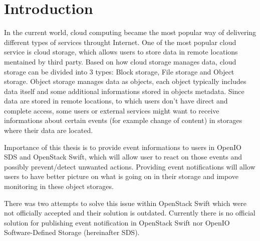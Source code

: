 

\chapter{Introduction}

In the current world, cloud computing became the most popular way of delivering different types of services throught Internet. One of the most popular cloud service is cloud storage, which allows users to store data in remote locations mentained by third party. Based on how cloud storage manages data, cloud storage can be divided into 3 types: Block storage, File storage and Object storage. Object storage manages data as objects, each object typically includes data itself and some additional informations stored in objects metadata. Since data are stored in remote locations, to which users don't have direct and complete access, some users or external services might want to receive informations about certain events (for example change of content) in storages where their data are located.

Importance of this thesis is to provide event informations to users in OpenIO SDS and OpenStack Swift, which will allow user to react on those events and possibly prevent/detect unwanted actions. Providing event notifications will allow users to have better picture on what is going on in their storage and impove monitoring in these object storages.

There was two attempts\cite{swiftPatch1}\cite{swiftPatch2} to solve this issue within OpenStack Swift which were not officially accepted and their solution is outdated. Currently there is no official solution for publishing event notification in OpenStack Swift nor OpenIO Software-Defined Storage (hereinafter SDS).


